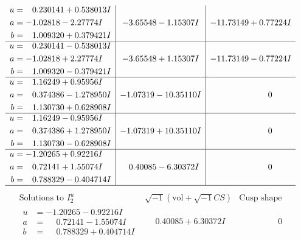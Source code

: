\documentclass[1p]{elsarticle_modified}
\theoremstyle{definition}
\newcommand{\I}{\sqrt{-1}}
\begin{document}
$$\begin{array}{c|c|c}
\begin{aligned}
u &= \phantom{-}0.230141 + 0.538013 I \\
a &= -1.02818 - 2.27774 I \\
b &= \phantom{-}1.009320 + 0.379421 I\end{aligned}
 & -3.65548 - 1.15307 I & -11.73149 + 0.77224 I \\ \hline\begin{aligned}
u &= \phantom{-}0.230141 - 0.538013 I \\
a &= -1.02818 + 2.27774 I \\
b &= \phantom{-}1.009320 - 0.379421 I\end{aligned}
 & -3.65548 + 1.15307 I & -11.73149 - 0.77224 I \\ \hline\begin{aligned}
u &= \phantom{-}1.16249 + 0.95956 I \\
a &= \phantom{-}0.374386 - 1.278950 I \\
b &= \phantom{-}1.130730 + 0.628908 I\end{aligned}
 & -1.07319 - 10.35110 I & \phantom{-0.000000 } 0 \\ \hline\begin{aligned}
u &= \phantom{-}1.16249 - 0.95956 I \\
a &= \phantom{-}0.374386 + 1.278950 I \\
b &= \phantom{-}1.130730 - 0.628908 I\end{aligned}
 & -1.07319 + 10.35110 I & \phantom{-0.000000 } 0 \\ \hline\begin{aligned}
u &= -1.20265 + 0.92216 I \\
a &= \phantom{-}0.72141 + 1.55074 I \\
b &= \phantom{-}0.788329 - 0.404714 I\end{aligned}
 & \phantom{-}0.40085 - 6.30372 I & \phantom{-0.000000 } 0\\
 \hline 
 \end{array}$$\newpage$$\begin{array}{c|c|c}  
\text{Solutions to }I^u_{2}& \I (\text{vol} + \sqrt{-1}CS) & \text{Cusp shape}\\
 \hline 
\begin{aligned}
u &= -1.20265 - 0.92216 I \\
a &= \phantom{-}0.72141 - 1.55074 I \\
b &= \phantom{-}0.788329 + 0.404714 I\end{aligned}
 & \phantom{-}0.40085 + 6.30372 I & \phantom{-0.000000 } 0 \\ \hline\begin{aligned}

\end{aligned}
\end{array}$$
\end{document}
